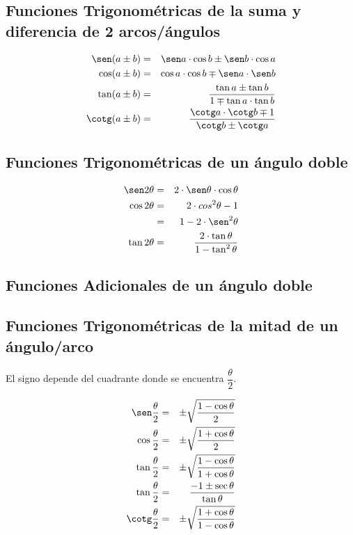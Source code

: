 \documentclass[12pt, a5paper]{article}
\begin{document}
	\subsection*{Funciones Trigonométricas de la suma y diferencia de 2 arcos/ángulos}
	
	\begin{eqnarray*}
		\sen(a \pm b) & = & \sen a \cdot \cos b \pm \sen b \cdot \cos a \\
		\cos(a \pm b) & = & \cos a \cdot \cos b \mp \sen a \cdot \sen b \\
		\tan (a \pm b) & = & \dfrac{\tan a \pm \tan b}{1 \mp \tan a \cdot \tan b} \\
		\cotg (a \pm b) & = & \dfrac{\cotg a \cdot \cotg b \mp 1}{\cotg b \pm \cotg a}
	\end{eqnarray*}
	
	\subsection*{Funciones Trigonométricas de un ángulo doble}
	\begin{eqnarray*}
		\sen 2\theta & = & 2 \cdot \sen \theta \cdot \cos \theta \\
		\cos 2\theta & = & 2 \cdot cos^{2} \theta - 1 \\
		\empty & = & 1 - 2 \cdot \sen^{2} \theta \\
		\tan 2\theta & = & \dfrac{2 \cdot \tan \theta}{1 - \tan^{2} \theta}
	\end{eqnarray*}
	
	\subsection*{Funciones Adicionales de un ángulo doble}
	
	
	
	\subsection*{Funciones Trigonométricas de la mitad de un ángulo/arco}
	El signo depende del cuadrante donde se encuentra $\dfrac{\theta}{2}$.
	
	\begin{eqnarray*}
		\sen \dfrac{\theta}{2} & = & \pm \sqrt{\dfrac{1 - \cos \theta}{2}} \\
		\cos \dfrac{\theta}{2} & = & \pm \sqrt{\dfrac{1 + \cos \theta}{2}} \\ 
		\tan \dfrac{\theta}{2} & = & \pm \sqrt{\dfrac{1 - \cos \theta}{1 + \cos \theta}} \\ 
		\tan \dfrac{\theta}{2} & = & \dfrac{-1 \pm \sec \theta}{\tan \theta} \\ 
		\cotg \dfrac{\theta}{2} & = & \pm \sqrt{\dfrac{1 + \cos \theta}{1 - \cos \theta}} \\ 
	\end{eqnarray*}
	
\end{document}
